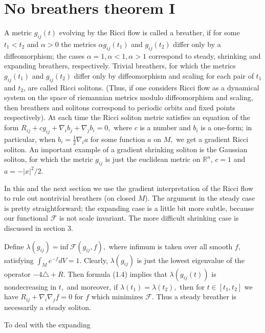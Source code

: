 \documentclass[12pt]{article}
\newcommand{\cF}{\mathcal {F}}
\theoremstyle{plain}
{\swapnumbers
\newtheorem{thm}{Theorem}[section]
\newtheorem{cor}[thm]{Corollary}
\newtheorem{lem}[thm]{Lemma}
\newtheorem{prop}[thm]{Proposition}
}
\theoremstyle{definition}
{\swapnumbers
\newtheorem{defn}[thm]{Definition}
\newtheorem{nota}[thm]{Notation}
\newtheorem{parag}[thm]{}
\newtheorem*{parstr}{\addtocounter{thm}{1}\thesection.\arabic{thm}*}
\newtheorem*{intropar}{\addtocounter{thm}{1}\arabic{thm}}
}
\theoremstyle{remark} {\swapnumbers
\newtheorem{rem}[thm]{Remark}
\newtheorem{exam}[thm]{Example}
\newtheorem{lemma}[thm]{Lemma}
\newtheorem{claim}[thm]{Claim}
}
\numberwithin{equation}{section}
\begin{document}
\section{No breathers theorem I} \begin{parag}\par  A metric $g_{ij}(t)$
evolving by the Ricci flow is called a breather, if for some
$t_1<t_2 $ and $\alpha>0$ the metrics $\alpha g_{ij}(t_1)$ and
$g_{ij}(t_2)$ differ only by a diffeomorphism; the cases $\alpha=1
, \alpha<1 , \alpha>1 $ correspond to steady, shrinking and
expanding breathers, respectively. Trivial breathers, for which
the metrics $g_{ij}(t_1)$ and $g_{ij}(t_2)$ differ only by
diffeomorphism and scaling for each pair of $t_1$ and $t_2$, are
called Ricci solitons. (Thus, if one considers Ricci flow as a
dynamical system on the space of riemannian metrics modulo
diffeomorphism and scaling, then breathers and solitons correspond
to periodic orbits and fixed points respectively). At each time
the Ricci soliton metric satisfies an equation of the form
$R_{ij}+cg_{ij}+\nabla_i b_j +\nabla_j b_i=0,$ where $c$ is a
number and $b_i$ is a one-form; in particular, when
$b_i=\frac{1}{2}\nabla_i a$ for some function $a$ on $M,$ we get a
gradient Ricci soliton. An important example of a gradient
shrinking soliton is the Gaussian soliton, for which the metric
$g_{ij}$ is just the euclidean metric on $\mathbb{R}^n$, $c=1$ and
$a=-|x|^2/2.$
\par In this and the next section we use the gradient
interpretation of the Ricci flow to rule out nontrivial breathers
(on closed $M$). The argument in the steady case is pretty
straightforward; the expanding case is a little bit more subtle,
because our functional $\cF$ is not scale invariant. The more
difficult shrinking case is discussed in section
3.\end{parag}\begin{parag}
\par  Define $\lambda(g_{ij})=\mbox{inf}\  \cF(g_{ij},f) ,$ where
infimum is taken over all smooth $f,$ satisfying $
\int_M{e^{-f}dV}=1 .$ Clearly, $\lambda(g_{ij})$ is just the
lowest eigenvalue of the operator $-4\triangle+R.$ Then formula
(1.4) implies that $\lambda(g_{ij}(t))$ is nondecreasing in $t,$
and moreover, if $\lambda(t_1)=\lambda(t_2),$ then for $t\in
[t_1,t_2]$ we have $R_{ij}+\nabla_i\nabla_j f=0$ for $f$ which
minimizes $\cF.$ Thus a steady breather is necessarily a steady
soliton. \end{parag}\begin{parag}\par  To deal with the expanding

\end{parag}
\end{document}
